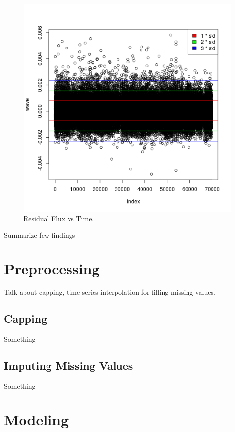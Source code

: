 \documentclass[%
aip,
amsmath,amssymb,
reprint,%
]{revtex4-1}
\begin{document}
\begin{figure}[h!]
	\includegraphics[width=\linewidth]{example.png}
	\caption{Residual Flux vs Time.}
	\label{fig:finaldf}
\end{figure}

Summarize few findings

\section{Preprocessing}

Talk about capping, time series interpolation for filling missing values.

\subsection{Capping}

Something

\subsection{Imputing Missing Values}

Something

\section{Modeling}
\end{document}
